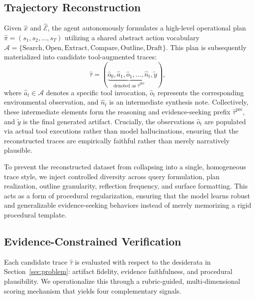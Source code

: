 \subsection{Trajectory Reconstruction}
Given $\hat{x}$ and $\hat{\mathcal{E}}$, the agent autonomously formulates a high-level operational plan $\hat{\pi}=(s_{1},s_{2},...,s_{T})$ utilizing a shared abstract action vocabulary $\mathcal{A} = \{\text{Search}, \text{Open}, \text{Extract}, \text{Compare}, \text{Outline}, \text{Draft}\}$. 
This plan is subsequently materialized into candidate tool-augmented traces:
\begin{equation}
\hat{\tau} = (\underbrace{\hat{o}_{0}, \hat{a}_{1}, \hat{o}_{1}, \dots, \hat{n}_{t}}_{\text{denoted as } \hat{\tau}^{\mathrm{pre}}}, \tilde{y}),
\end{equation}
where $\hat{a}_{t} \in \mathcal{A}$ denotes a specific tool invocation, $\hat{o}_{t}$ represents the corresponding environmental observation, and $\hat{n}_{t}$ is an intermediate synthesis note. Collectively, these intermediate elements form the reasoning and evidence-seeking prefix $\hat{\tau}^{\mathrm{pre}}$, and $\tilde{y}$ is the final generated artifact.
Crucially, the observations $\hat{o}_{t}$ are populated via actual tool executions rather than model hallucinations, ensuring that the reconstructed traces are empirically faithful rather than merely narratively plausible.

To prevent the reconstructed dataset from collapsing into a single, homogeneous trace style, we inject controlled diversity across query formulation, plan realization, outline granularity, reflection frequency, and surface formatting. This acts as a form of procedural regularization, ensuring that the model learns robust and generalizable evidence-seeking behaviors instead of merely memorizing a rigid procedural template.

\subsection{Evidence-Constrained Verification}
Each candidate trace $\hat{\tau}$ is evaluated with respect to the desiderata in Section~\ref{sec:problem}: artifact fidelity, evidence faithfulness, and procedural plausibility. We operationalize this through a rubric-guided, multi-dimensional scoring mechanism that yields four complementary signals.

